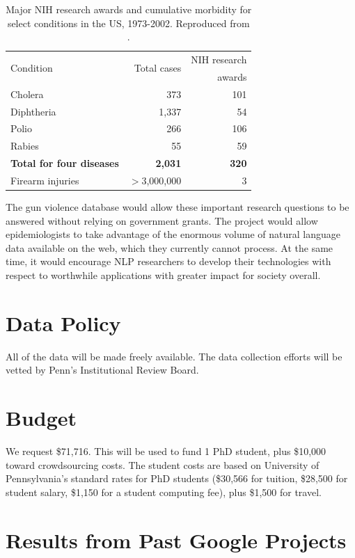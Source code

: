 \documentclass[11pt]{article}
\begin{document}
\begin{table}
\centering
\footnotesize
\begin{tabular}{lrr}
\hline\hline
\multirow{2}{*}{Condition} & \multirow{2}{*}{Total cases} & \multirow{1}{*}{NIH research}\\
&& \multirow{1}{*}{awards}\\\hline
Cholera & 373 & 101 \\
Diphtheria & 1,337 & 54 \\
Polio & 266 & 106 \\
Rabies & 55 & 59 \\
\textbf{Total for four diseases} & \textbf{2,031} & \textbf{320} \\
Firearm injuries & $>$3,000,000 & 3 \\
\hline\hline
\end{tabular}
\label{nih}
\caption{Major NIH research awards and cumulative morbidity for select conditions in the US, 1973-2002. Reproduced from .}
\end{table}

The gun violence database would allow these important research questions to be answered without relying on government grants. The project would allow epidemiologists to take advantage of the enormous volume of natural language data available on the web, which they currently cannot process. At the same time, it would encourage NLP researchers to develop their technologies with respect to worthwhile applications with greater impact for society overall. 


\section{Data Policy}

All of the data will be made freely available.  The data collection efforts will be vetted by Penn's Institutional Review Board.

\section{Budget}

We request \$71,716.  This will be used to fund 1 PhD student, plus \$10,000 toward crowdsourcing costs.  The student costs are based on
University of Pennsylvania's standard rates for PhD students (\$30,566
for tuition, \$28,500 for student salary, \$1,150 for a student
computing fee), plus \$1,500 for travel.  


\section{Results from Past Google Projects}
\end{document}
